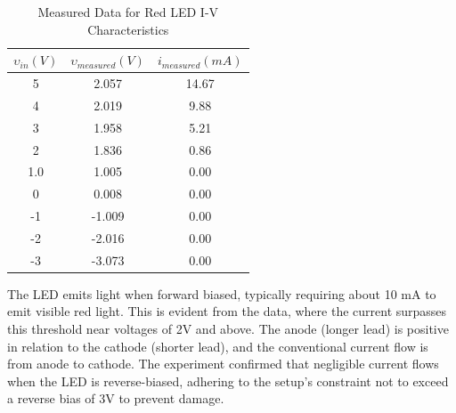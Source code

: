 \documentclass[12pt]{article}
\begin{document}
\begin{table}[H]
	\centering
	\begin{tabular}{|c|c|c|}
		\hline
		\textbf{\(\upsilon_{in} (V)\)} & \textbf{\(\upsilon_{measured} (V)\)} &
		\textbf{\(i_{measured} (mA)\)}                                                \\
		\hline
		5                              & 2.057                                & 14.67 \\
		4                              & 2.019                                & 9.88  \\
		3                              & 1.958                                & 5.21  \\
		2                              & 1.836                                & 0.86  \\
		1.0                            & 1.005                                & 0.00  \\
		0                              & 0.008                                & 0.00  \\
		-1                             & -1.009                               & 0.00  \\
		-2                             & -2.016                               & 0.00  \\
		-3                             & -3.073                               & 0.00  \\
		\hline
	\end{tabular}
	\caption{Measured Data for Red LED I-V Characteristics}
	\label{tab:led_data}
\end{table}
The LED emits light when forward biased, typically requiring about 10 mA to emit visible red light. This is evident from the data, where the current surpasses this threshold near voltages of 2V and above. The anode (longer lead) is positive in relation to the cathode (shorter lead), and the conventional current flow is from anode to cathode. The experiment confirmed that negligible current flows when the LED is reverse-biased, adhering to the setup's constraint not to exceed a reverse bias of 3V to prevent damage.
\end{document}
